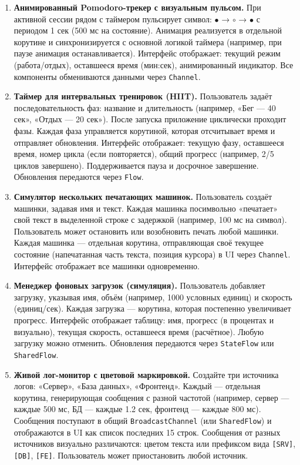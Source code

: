 \begin{enumerate}
\item[5]
\textbf{Анимированный Pomodoro-трекер с визуальным пульсом.} 
При активной сессии рядом с таймером пульсирует символ: \texttt{$\bullet$} → \texttt{$\circ$} → \texttt{$\bullet$} с периодом 1 сек (500 мс на состояние). Анимация реализуется в отдельной корутине и синхронизируется с основной логикой таймера (например, при паузе анимация останавливается). Интерфейс отображает: текущий режим (работа/отдых), оставшееся время (мин:сек), анимированный индикатор. Все компоненты обмениваются данными через \texttt{Channel}.

\item[6]
\textbf{Таймер для интервальных тренировок (HIIT).} Пользователь задаёт последовательность фаз: название и длительность (например, «Бег — 40 сек», «Отдых — 20 сек»). После запуска приложение циклически проходит фазы. Каждая фаза управляется корутиной, которая отсчитывает время и отправляет обновления. Интерфейс отображает: текущую фазу, оставшееся время, номер цикла (если повторяется), общий прогресс (например, 2/5 циклов завершено). Поддерживается пауза и досрочное завершение. Обновления передаются через \texttt{Flow}.

\item[7]
\textbf{Симулятор нескольких печатающих машинок.} Пользователь создаёт машинки, задавая имя и текст. Каждая машинка посимвольно «печатает» свой текст в выделенной строке с задержкой (например, 100 мс на символ). Пользователь может остановить или возобновить печать любой машинки. Каждая машинка — отдельная корутина, отправляющая своё текущее состояние (напечатанная часть текста, позиция курсора) в UI через \texttt{Channel}. Интерфейс отображает все машинки одновременно.

\item[8]
\textbf{Менеджер фоновых загрузок (симуляция).} Пользователь добавляет загрузку, указывая имя, объём (например, 1000 условных единиц) и скорость (единиц/сек). Каждая загрузка — корутина, которая постепенно увеличивает прогресс. Интерфейс отображает таблицу: имя, прогресс (в процентах и визуально), текущая скорость, оставшееся время (расчётное). Любую загрузку можно отменить. Обновления передаются через \texttt{StateFlow} или \texttt{SharedFlow}.

\item[9]
\textbf{Живой лог-монитор с цветовой маркировкой.} Создайте три источника логов: «Сервер», «База данных», «Фронтенд». Каждый — отдельная корутина, генерирующая сообщения с разной частотой (например, сервер — каждые 500 мс, БД — каждые 1.2 сек, фронтенд — каждые 800 мс). Сообщения поступают в общий \texttt{BroadcastChannel} (или \texttt{SharedFlow}) и отображаются в UI как список последних 15 строк. Сообщения от разных источников визуально различаются: цветом текста или префиксом вида \texttt{[SRV]}, \texttt{[DB]}, \texttt{[FE]}. Пользователь может приостановить любой источник.


\end{enumerate}
